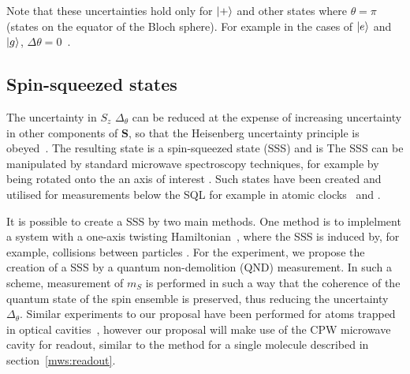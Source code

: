 Note that these uncertainties hold only for $\ket{+}$ and other states where
$\theta = \pi$ (states on the equator of the Bloch sphere). For example in the
cases of $\ket{e}$ and $\ket{g}$, $\Delta \theta = 0$~\cite{PhysRevA.47.3554}.

\subsection{Spin-squeezed states}

The uncertainty in $S_z$ $\Delta_\theta$ can be reduced at the expense of
increasing uncertainty in other components of $\mathbf{S}$, so that the
Heisenberg uncertainty principle is obeyed~\cite{}. The resulting state is a
spin-squeezed state (SSS) and is  The SSS can be
manipulated by standard microwave spectroscopy techniques, for example by being
rotated onto the an axis of interest . Such states have
been created and utilised for measurements below the SQL for example in atomic
clocks~\cite{} and .

It is possible to create a SSS by two main methods. One method is to implelment
a system with a one-axis twisting Hamiltonian~\cite{}, where the SSS is induced
by, for example, collisions between particles . For the
\CaF{} experiment, we propose the creation of a SSS by a quantum non-demolition
(QND) measurement. In such a scheme, measurement of
$m_S$ is performed in such a way that the coherence of the quantum state of the
spin ensemble is preserved, thus reducing the uncertainty $\Delta_\theta$.
Similar experiments to our proposal have been performed for atoms trapped in
optical cavities~\cite{Cox2016, SchleierSmith2011}, however our proposal will 
make use of the CPW microwave cavity for readout, similar to the method for a
single molecule described in section~\ref{mws:readout}.

